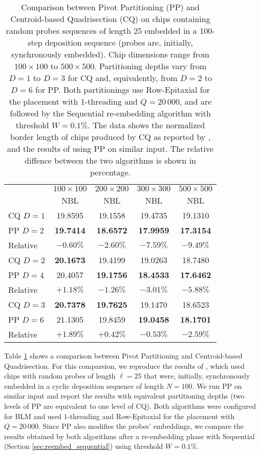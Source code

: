 \begin{table}[t!]\centering
\caption{\label{tab:pp_x_cq}
  Comparison between Pivot Partitioning (PP) and Centroid-based Quadrisection
  (CQ) on chips containing random probes sequences of length 25 embedded in a
  100-step deposition sequence (probes are, initially, synchronously embedded).
  Chip dimensions range from $100\times 100$ to $500\times 500$. Partitioning
  depths vary from $D=1$ to $D=3$ for CQ and, equivalently, from $D=2$ to $D=6$
  for PP. Both partitionings use Row-Epitaxial for the placement with
  $1$-threading and $Q = 20\,000$, and are followed by the Sequential
  re-embedding algorithm with threshold $W=0.1\%$. The data shows the normalized
  border length of chips produced by CQ as reported by \citet{Kahng2003a}, and
  the results of using PP on similar input. The relative diffence between the
  two algorithms is shown in percentage.}
\footnotesize{
\begin{tabular}{lcccc}
\vspace{1pt}
 & $100\times 100$ & $200\times 200$ & $300\times 300$ & $500\times 500$ \\
\cline{2-5}
\vspace{1pt}
 & NBL             & NBL             & NBL             & NBL \\
\hline
CQ $D=1$ &      19.8595  &      19.1558  &      19.4735  &      19.1310  \\
PP $D=2$ & {\bf 19.7414} & {\bf 18.6572} & {\bf 17.9959} & {\bf 17.3154} \\
Relative &     $-0.60\%$ &     $-2.60\%$ &     $-7.59\%$ &     $-9.49\%$ \\
\hline
CQ $D=2$ & {\bf 20.1673} &      19.4199  &      19.0263  &      18.7480  \\
PP $D=4$ &      20.4057  & {\bf 19.1756} & {\bf 18.4533} & {\bf 17.6462} \\
Relative &     $+1.18\%$ &     $-1.26\%$ &     $-3.01\%$ &     $-5.88\%$ \\
\hline
CQ $D=3$ & {\bf 20.7378} & {\bf 19.7625} &      19.1470  &      18.6523  \\
PP $D=6$ &      21.1305  &      19.8459  & {\bf 19.0458} & {\bf 18.1701} \\
Relative &     $+1.89\%$ &     $+0.42\%$ &     $-0.53\%$ &     $-2.59\%$ \\
\hline
\end{tabular}}
\end{table}

Table \ref{tab:pp_x_cq} shows a comparison between Pivot Partitioning and
Centroid-based Quadrisection. For this comparsion, we reproduce the results of
\citet{Kahng2003a}, which used chips with random probes of length $\ell=25$ that
were, initially, synchronously embedded in a cyclic deposition sequence of
length $N=100$. We run PP on similar input and report the results with
equivalent partitioning depths (two levels of PP are equivalent to one level of
CQ). Both algorithms were configured for BLM and used $1$-threading and
Row-Epitaxial for the placement with $Q = 20\,000$. Since PP also modifies the
probes' embeddings, we compare the results obtained by both algorithms after a
re-embedding phase with Sequential (Section \ref{sec:reembed_sequential}) using
threshold $W=0.1\%$.

